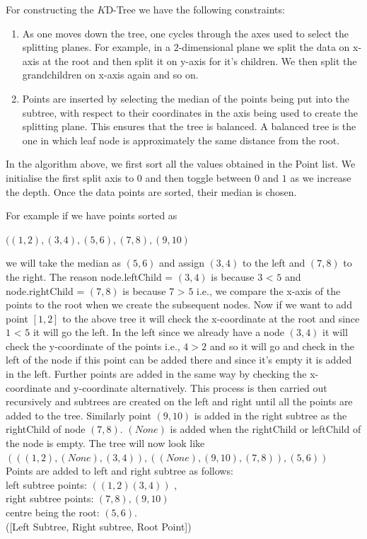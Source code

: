 For constructing the $K$D-Tree we have the following constraints:


\begin{enumerate}
    \item {As one moves down the tree, one cycles through the axes used to select the splitting planes. For example, in a $2$-dimensional plane we split the data on x-axis at the root and then split it on y-axis for it's children. We then split the grandchildren on x-axis again and so on.}
    \item {Points are inserted by selecting the median of the points being put into the subtree, with respect to their coordinates in the axis being used to create the splitting plane. This ensures that the tree is balanced. A balanced tree is the one in which leaf node is approximately the same distance from the root.}\\
\end{enumerate}    
    
In the algorithm above, we first sort all the values obtained in the Point list. We initialise the first split axis to $0$ and then toggle between $0$ and $1$ as we increase the depth. Once the data points are sorted, their median is chosen. 
\begin{mscexample}
    For example if we have points sorted as 

                $((1,2),(3,4),(5,6),(7,8),(9,10)$
    
    we will take the median as $(5,6)$ and assign $(3,4)$ to the left and $(7,8)$ to the right. The reason node.leftChild = $(3,4)$ is because $3$ < $5$ and node.rightChild = $(7,8)$ is because $7$ > $5$ i.e., we compare the x-axis of the points to the root when we create the subsequent nodes. Now if we want to add point $[1,2]$ to the above tree it will check the x-coordinate at the root and since $1$ < $5$ it will go the left. In the left since we already have a node $(3,4)$ it will check the y-coordinate of the points i.e., $4>2$ and so it will go and check in the left of the node if this point can be added there and since it's empty it is added in the left. Further points are added in the same way by checking the x-coordinate and y-coordinate alternatively. This process is then carried out recursively and subtrees are created on the left and right until all the points are added to the tree. Similarly point $(9,10)$ is added in the right subtree as the rightChild of
    node $(7,8)$. $(None)$ is added when the rightChild or leftChild of the node is empty. The tree will now look like\\

    $(((1,2),(None),(3,4)),((None),(9,10),(7,8)),(5,6))$\\

    Points are added to left and right subtree as follows:\\
    left subtree points: $((1,2)(3,4))$ ,\\
    right subtree points: $(7,8),(9,10)$ \\ 
    centre being the root: $(5,6)$. \\
    ([Left Subtree, Right subtree, Root Point])
\end{mscexample}
